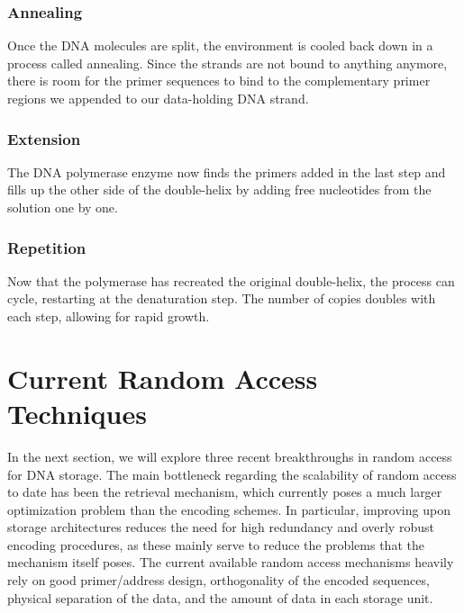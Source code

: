 \documentclass[a4paper,conference]{IEEEtran}
\begin{document}
\subsubsection{Annealing}
Once the DNA molecules are split, the environment is cooled back down in a process called annealing. Since the strands are not bound to anything anymore, there is room for the primer sequences to bind to the complementary primer regions we appended to our data-holding DNA strand.\\

\subsubsection{Extension}
The DNA polymerase enzyme now finds the primers added in the last step and fills up the other side of the double-helix by adding free nucleotides from the solution one by one.\\

\subsubsection{Repetition}
Now that the polymerase has recreated the original double-helix, the process can cycle, restarting at the denaturation step. The number of copies doubles with each step, allowing for rapid growth.\\

\section{Current Random Access Techniques}
In the next section, we will explore three recent breakthroughs in random access for DNA storage. The main bottleneck regarding the scalability of random access to date has been the retrieval mechanism, which currently poses a much larger optimization problem than the encoding schemes. In particular, improving upon storage architectures reduces the need for high redundancy and overly robust encoding procedures, as these mainly serve to reduce the problems that the mechanism itself poses. The current available random access mechanisms heavily rely on good primer/address design, orthogonality of the encoded sequences, physical separation of the data, and the amount of data in each storage unit.
\end{document}
